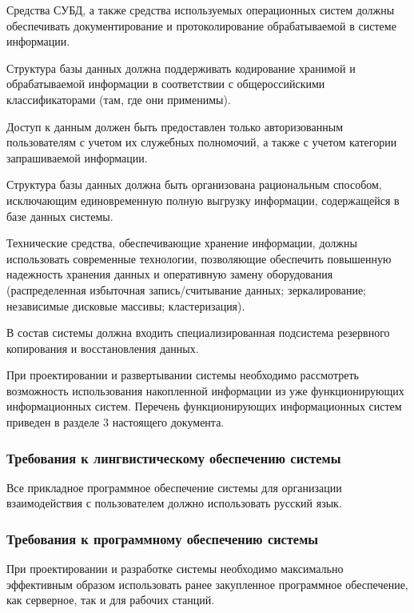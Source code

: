 \documentclass[russian, utf8, 12pt,pointsubsection,floatsubsection]{eskdtext}
\begin{document}
Средства СУБД, а также средства используемых операционных систем должны обеспечивать документирование и протоколирование обрабатываемой в системе информации.

Структура базы данных должна поддерживать кодирование хранимой и обрабатываемой информации в соответствии с общероссийскими классификаторами (там, где они применимы).

Доступ к данным должен быть предоставлен только авторизованным пользователям с учетом их служебных полномочий, а также с учетом категории запрашиваемой информации.

Структура базы данных должна быть организована рациональным способом, исключающим единовременную полную выгрузку информации, содержащейся в базе данных системы.

Технические средства, обеспечивающие хранение информации, должны использовать современные технологии, позволяющие обеспечить повышенную надежность хранения данных и оперативную замену оборудования (распределенная избыточная запись/считывание данных; зеркалирование; независимые дисковые массивы; кластеризация).

В состав системы должна входить специализированная подсистема резервного копирования и восстановления данных.

При проектировании и развертывании системы необходимо рассмотреть возможность использования накопленной информации из уже функционирующих информационных систем. Перечень функционирующих информационных систем приведен в разделе 3 настоящего документа.


\subsubsection{Требования к лингвистическому обеспечению системы}
Все прикладное программное обеспечение системы для организации взаимодействия с пользователем должно использовать русский язык.


\subsubsection{Требования к программному обеспечению системы}
При проектировании и разработке системы необходимо максимально эффективным образом использовать ранее закупленное программное обеспечение, как серверное, так и для рабочих станций.
\end{document}
